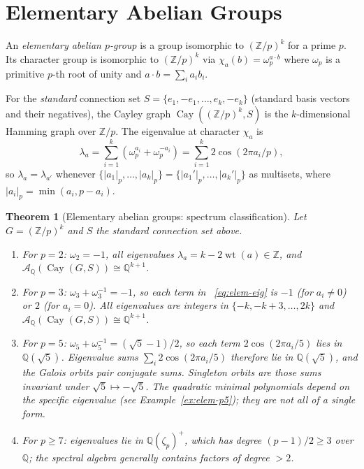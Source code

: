 \documentclass[12pt]{amsart}
\numberwithin{equation}{section}
\theoremstyle{plain}
\newtheorem{theorem}{Theorem}[section]
\theoremstyle{definition}
\DeclareMathOperator{\wt}{wt}
\DeclareMathOperator{\Cay}{Cay}
\newcommand{\Z}{\mathbb{Z}}
\newcommand{\Q}{\mathbb{Q}}
\newcommand{\calA}{\mathcal{A}}
\begin{document}
\section{Elementary Abelian Groups}
\label{sec:elem}

An \emph{elementary abelian $p$-group} is a group isomorphic to
$(\Z/p)^k$ for a prime $p$.  Its character group is isomorphic to
$(\Z/p)^k$ via $\chi_a(b) = \omega_p^{a \cdot b}$ where $\omega_p$ is a
primitive $p$-th root of unity and $a \cdot b = \sum_i a_i b_i$.

For the \emph{standard} connection set $S = \{e_1, -e_1, \ldots, e_k, -e_k\}$
(standard basis vectors and their negatives), the Cayley graph
$\Cay((\Z/p)^k, S)$ is the $k$-dimensional Hamming graph over $\Z/p$.
The eigenvalue at character $\chi_a$ is
\begin{equation}
\label{eq:elem-eig}
  \lambda_a = \sum_{i=1}^k (\omega_p^{a_i} + \omega_p^{-a_i})
  = \sum_{i=1}^k 2\cos(2\pi a_i/p),
\end{equation}
so $\lambda_a = \lambda_{a'}$ whenever $\{|a_1|_p, \ldots, |a_k|_p\}
= \{|a_1'|_p, \ldots, |a_k'|_p\}$ as multisets, where $|a_i|_p =
\min(a_i, p - a_i)$.

\begin{theorem}[Elementary abelian groups: spectrum classification]
\label{thm:elem}
Let $G = (\Z/p)^k$ and $S$ the standard connection set above.
\begin{enumerate}[label=\textup{(\roman*)}]
  \item For $p = 2$: $\omega_2 = -1$, all eigenvalues $\lambda_a =
        k - 2\wt(a) \in \Z$, and
        $\calA_\Q(\Cay(G,S)) \cong \Q^{k+1}$.

  \item For $p = 3$: $\omega_3 + \omega_3^{-1} = -1$, so each term in
        ~\eqref{eq:elem-eig} is $-1$ (for $a_i \ne 0$) or $2$ (for
        $a_i = 0$).  All eigenvalues are integers in $\{-k, -k+3, \ldots, 2k\}$
        and $\calA_\Q(\Cay(G,S)) \cong \Q^{k+1}$.

  \item For $p = 5$: $\omega_5 + \omega_5^{-1} = (\sqrt{5}-1)/2$, so
        each term $2\cos(2\pi a_i/5)$ lies in $\Q(\sqrt{5})$.  Eigenvalue
        sums $\sum_i 2\cos(2\pi a_i/5)$ therefore lie in $\Q(\sqrt{5})$,
        and the Galois orbits pair conjugate sums.  Singleton orbits are
        those sums invariant under $\sqrt{5} \mapsto -\sqrt{5}$.  The
        quadratic minimal polynomials depend on the specific eigenvalue
        (see Example~\ref{ex:elem-p5}); they are not all of a single form.

  \item For $p \ge 7$: eigenvalues lie in $\Q(\zeta_p)^+$, which has
        degree $(p-1)/2 \ge 3$ over $\Q$; the spectral algebra generally
        contains factors of degree $> 2$.
\end{enumerate}
\end{theorem}
\end{document}
